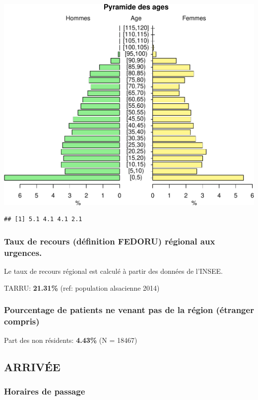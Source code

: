 \documentclass[]{article}
\begin{document}
\includegraphics{rapport2014_V4_files/figure-latex/pyramide-1.pdf}

\begin{verbatim}
## [1] 5.1 4.1 4.1 2.1
\end{verbatim}

\subsubsection{Taux de recours (définition FEDORU) régional aux
urgences.}\label{taux-de-recours-definition-fedoru-regional-aux-urgences.}

Le taux de recours régional est calculé à partir des données de l'INSEE.

TARRU: \textbf{21.31\%} (ref: population alsacienne 2014)

\subsubsection{Pourcentage de patients ne venant pas de la région
(étranger
compris)}\label{pourcentage-de-patients-ne-venant-pas-de-la-region-etranger-compris}

Part des non résidents: \textbf{4.43\%} (N = 18467)

\subsection{ARRIVÉE}\label{arrivee}

\subsubsection{Horaires de passage}\label{horaires-de-passage}
\end{document}
